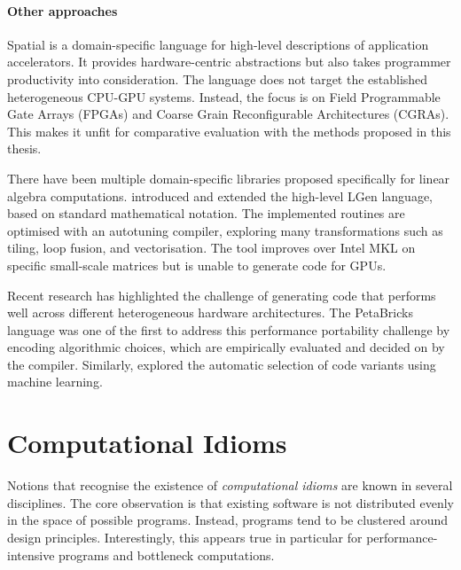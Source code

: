     \paragraph*{Other approaches}
    Spatial \citep{Koeplinger:2018:SLC:3192366.3192379} is a domain-specific
    language for high-level descriptions of application accelerators.
    It provides hardware-centric abstractions but also takes programmer
    productivity into consideration.
    The language does not target the established heterogeneous CPU-GPU
    systems.
    Instead, the focus is on  Field Programmable Gate Arrays (FPGAs) and
    Coarse Grain Reconfigurable Architectures (CGRAs).
    This makes it unfit for comparative evaluation with the methods proposed in
    this thesis.

    There have been multiple domain-specific libraries proposed specifically
    for linear algebra computations.
    \citet{Spampinato:2014:BLA:2581122.2544155,
    Spampinato:2016:BLA:2854038.2854060} introduced and extended the high-level
    LGen language, based on standard mathematical notation.
    The implemented routines are optimised with an autotuning compiler,
    exploring many transformations such as tiling, loop fusion, and
    vectorisation.
    The tool improves over Intel MKL on specific small-scale matrices but is
    unable to generate code for GPUs.

    Recent research has highlighted the challenge of generating code that
    performs well across different heterogeneous hardware architectures.
    The PetaBricks language
    \citep{Ansel:2009:PLC:1542476.1542481,PhothilimthanaARA13} was
    one of the first to address this performance portability challenge
    by encoding algorithmic choices, which are empirically evaluated and decided
    on by the compiler.
    Similarly, \citet{MuralidharanRHG16} explored the automatic selection of
    code variants using machine learning.

\section{Computational Idioms}

    Notions that recognise the existence of {\it computational idioms} are
    known in several disciplines.
    The core observation is that existing software is not distributed evenly in
    the space of possible programs.
    Instead, programs tend to be clustered around design principles.
    Interestingly, this appears true in particular for performance-intensive
    programs and bottleneck computations.

